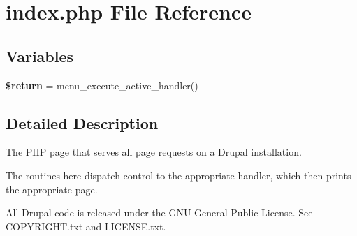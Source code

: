 \hypertarget{index_8php}{
\section{index.php File Reference}
\label{index_8php}
}
\subsection*{Variables}
\begin{CompactItemize}
\item 
\hypertarget{index_8php_9e8633cf48f7c5fc8cc9f5fa31450b99}{
\textbf{\$return} = menu\_\-execute\_\-active\_\-handler()}
\label{index_8php_9e8633cf48f7c5fc8cc9f5fa31450b99}

\end{CompactItemize}


\subsection{Detailed Description}
The PHP page that serves all page requests on a Drupal installation.

The routines here dispatch control to the appropriate handler, which then prints the appropriate page.

All Drupal code is released under the GNU General Public License. See COPYRIGHT.txt and LICENSE.txt. 